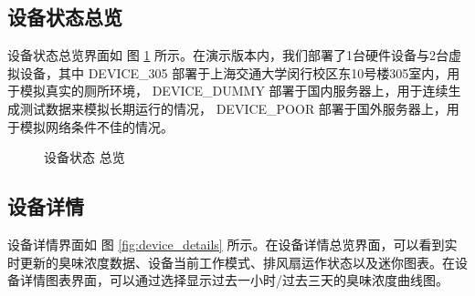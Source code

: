 \documentclass[degree=course]{sjtuthesis}
\begin{document}
\subsection{设备状态总览}
设备状态总览界面如 图 \ref{fig:device_overall} 所示。在演示版本内，我们部署了1台硬件设备与2台虚拟设备，其中 DEVICE\_305 部署于上海交通大学闵行校区东10号楼305室内，用于模拟真实的厕所环境， DEVICE\_DUMMY 部署于国内服务器上，用于连续生成测试数据来模拟长期运行的情况， DEVICE\_POOR 部署于国外服务器上，用于模拟网络条件不佳的情况。
\begin{figure}[htbp]
    \noindent{}
    \caption{设备状态 总览}\label{fig:device_overall}
\end{figure}
\subsection{设备详情}
设备详情界面如 图 \ref{fig:device_details} 所示。在设备详情总览界面，可以看到实时更新的臭味浓度数据、设备当前工作模式、排风扇运作状态以及迷你图表。在设备详情图表界面，可以通过选择显示过去一小时/过去三天的臭味浓度曲线图。
\end{document}
